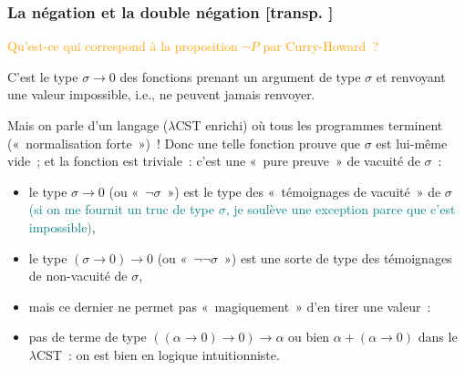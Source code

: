 \documentclass[mathserif,a4paper,aspectratio=169]{beamer}
\renewcommand{\frametitle}[1]{\subsubsection*{#1 {\footnotesize[transp. \insertframenumber]}}}
\begin{document}
\begin{frame}
\frametitle{La négation et la double négation}

\textcolor{orange}{Qu'est-ce qui correspond à la proposition $\neg P$
  par Curry-Howard ?}

\medskip

C'est le type $\sigma \rightarrow 0$ des fonctions prenant un argument
de type $\sigma$ et renvoyant une valeur impossible, i.e., ne peuvent
jamais renvoyer.

\medskip

Mais on parle d'un langage ($\lambda$CST enrichi) où \alert{tous les
  programmes terminent} (« normalisation forte ») !  Donc une telle
fonction prouve que $\sigma$ est lui-même vide ; et la fonction est
triviale : c'est une « pure preuve » de vacuité de $\sigma$ :

\smallskip

\begin{itemize}
\item le type $\sigma \rightarrow 0$ (ou « $\neg\sigma$ ») est le type
  des « témoignages de vacuité » de $\sigma$ \textcolor{teal}{(si on
    me fournit un truc de type $\sigma$, je soulève une exception
    parce que c'est impossible)},
\item le type $(\sigma \rightarrow 0) \rightarrow 0$ (ou
  « $\neg\neg\sigma$ ») est une sorte de type des témoignages de
  \alert{non-vacuité} de $\sigma$,
\item mais ce dernier ne permet pas « magiquement » d'en tirer une
  valeur :
\item pas de terme de type $((\alpha \rightarrow 0) \rightarrow 0) \to
  \alpha$ ou bien $\alpha + (\alpha\rightarrow 0)$ dans le
  $\lambda$CST : on est bien en \alert{logique intuitionniste}.
\end{itemize}

\end{frame}
%
\end{document}
